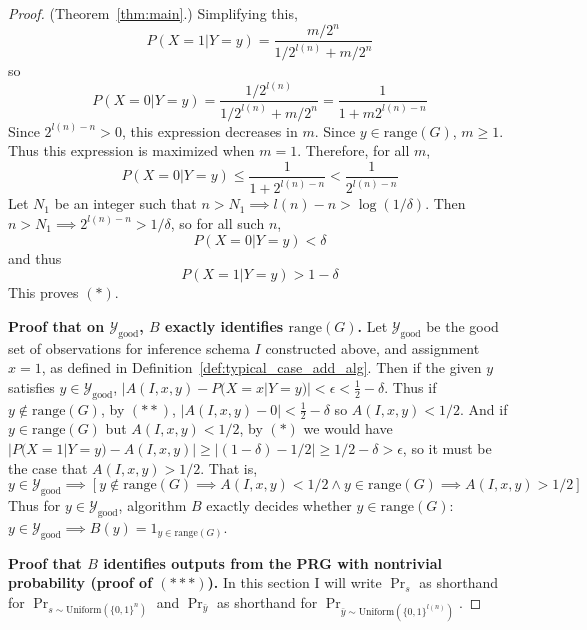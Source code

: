 \documentclass{article}
\def \Ygood{\mathcal{Y}_\text{good}}
\theoremstyle{definition}
\theoremstyle{remark}
\begin{document}
\begin{proof}{(Theorem~\ref{thm:main}.)}
Simplifying this, 
$$
P(X = 1 | Y = y) = \frac{
    m/2^n
}{
    1/2^{l(n)} + m/2^n
}
$$
so
$$
P(X = 0 | Y = y) = \frac{
    1/2^{l(n)}
}{
    1/2^{l(n)} + m/2^n
} = \frac{1}{1 + m 2^{l(n) - n}}
$$
Since $2^{l(n) - n} > 0$, this expression decreases in $m$.
Since $y \in \text{range}(G)$, $m \geq 1$.
Thus this expression is maximized when $m = 1$.
Therefore, for all $m$,
$$
P(X = 0 | Y = y) \leq \frac{1}{1 + 2^{l(n) - n}} < \frac{1}{2^{l(n) - n}}
$$
Let $N_1$ be an integer such that
$n > N_1 \implies l(n) - n > \log(1/\delta)$.
Then $n > N_1 \implies 2^{l(n) - n} > 1/\delta$,
so for all such $n$,
$$
P(X = 0 | Y = y) < \delta
$$
and thus
$$
P(X = 1 | Y = y) > 1 - \delta
$$
This proves $(*)$.

\medskip
\noindent \textbf{Proof that on $\Ygood$, $B$ exactly identifies $\text{range}(G)$.}
Let $\Ygood$ be the good set of observations for inference schema $I$ constructed above, and assignment $x = 1$, as defined in Definition~\ref{def:typical_case_add_alg}.
Then if the given $y$ satisfies $y \in \Ygood$, $|A(I, x, y) - P(X = x | Y = y)| < \epsilon < \frac{1}{2} - \delta$.
Thus if $y \notin \text{range}(G)$, by $(**)$, $|A(I, x, y) - 0| < \frac{1}{2} - \delta$ so $A(I, x, y) < 1/2$.
And if $y \in \text{range}(G)$ but $A(I, x, y) < 1/2$, by $(*)$ we would have $|P(X = 1 | Y = y) - A(I, x, y)| \geq |(1 - \delta) - 1/2| \geq 1/2 - \delta > \epsilon$, so it must be the case that $A(I, x, y) > 1/2$.
That is,
$$
y \in \Ygood \implies [y \notin \text{range}(G) \implies A(I, x, y) < 1/2 \wedge y \in \text{range}(G) \implies A(I, x, y) > 1/2]
$$
Thus for $y \in \Ygood$, algorithm $B$ exactly decides whether $y \in \text{range}(G)$: $y \in \Ygood \implies B(y) = 1_{y \in \text{range}(G)}$.

\medskip
\noindent \textbf{Proof that $B$ identifies outputs from the PRG with nontrivial probability (proof of $(***)$).}
In this section I will write $\Pr_s$ as shorthand for $\Pr_{s \sim \text{Uniform}(\{0, 1\}^n)}$ and $\Pr_{\bar{y}}$ as shorthand for $\Pr_{\bar{y} \sim \text{Uniform}(\{0, 1\}^{l(n)})}$.


\end{proof}
\end{document}
